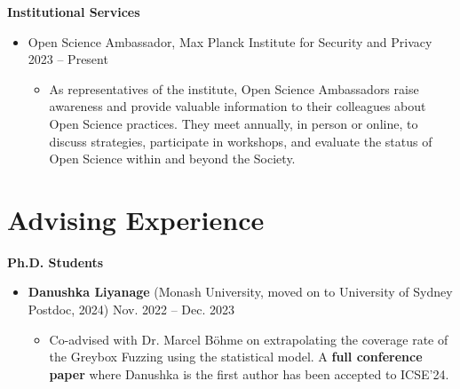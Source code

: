 \documentclass[letterpaper,11pt]{article}
\begin{document}
\textbf{Institutional Services}\vspace{-4pt}
\begin{itemize}
  \item Open Science Ambassador, Max Planck Institute for Security and Privacy \hfill   2023 -- Present  \vspace{-6pt}
  \begin{itemize}[leftmargin=.5cm]
    \item[] As representatives of the institute, Open Science Ambassadors raise awareness and provide valuable information to their colleagues about Open Science practices. They meet annually, in person or online, to discuss strategies, participate in workshops, and evaluate the status of Open Science within and beyond the Society.
  \end{itemize}
\end{itemize}


\section{Advising Experience}
\textbf{Ph.D. Students}\vspace{-4pt}
\begin{itemize}
  \item \textbf{Danushka Liyanage} (Monash University, moved on to University of Sydney Postdoc, 2024) \hfill Nov. 2022 -- Dec. 2023 \vspace{-6pt}
  \begin{itemize}[leftmargin=.5cm]
    \item[] Co-advised with Dr. Marcel Böhme on extrapolating the coverage rate of the Greybox Fuzzing using the statistical model. A \textbf{full conference paper} where Danushka is the first author has been accepted to ICSE'24.
  \end{itemize}
\end{itemize}
\end{document}

